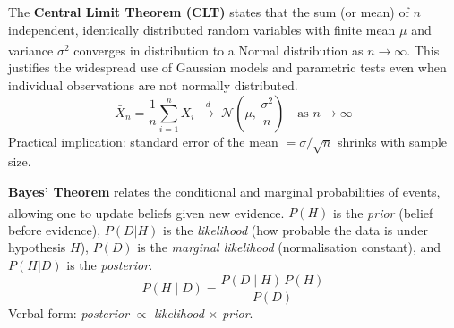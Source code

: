 \begin{tcbitemize}[ skin=sectionraster ]
        \tcbitem[title={Central Limit Theorem}, raster multicolumn=6]
        The \textbf{Central Limit Theorem (CLT)} states that the sum (or mean) of $n$ independent, identically distributed random variables with finite mean $\mu$ and variance $\sigma^2$ converges in distribution to a Normal distribution as $n \to \infty$\textsuperscript{\cite{downeyThinkStatsExploratory2015}}. This justifies the widespread use of Gaussian models and parametric tests even when individual observations are not normally distributed.
        \tcblower
        \begin{equation}
            \bar{X}_n = \frac{1}{n}\sum_{i=1}^n X_i \;\xrightarrow{d}\; \mathcal{N}\!\left(\mu,\, \frac{\sigma^2}{n}\right) \quad \text{as } n \to \infty
        \end{equation}
        Practical implication: standard error of the mean $= \sigma / \sqrt{n}$ shrinks with sample size.

        \tcbitem[title={Bayes’ Theorem}, raster multicolumn=6]
        \textbf{Bayes’ Theorem} relates the conditional and marginal probabilities of events, allowing one to update beliefs given new evidence\textsuperscript{\cite{downeyThinkBayes2016}}. $P(H)$ is the \emph{prior} (belief before evidence), $P(D|H)$ is the \emph{likelihood} (how probable the data is under hypothesis $H$), $P(D)$ is the \emph{marginal likelihood} (normalisation constant), and $P(H|D)$ is the \emph{posterior}.
        \tcblower
        \begin{equation}
            P(H \mid D) = \frac{P(D \mid H)\, P(H)}{P(D)}
        \end{equation}
        Verbal form: \emph{posterior} $\propto$ \emph{likelihood} $\times$ \emph{prior}.

    \end{tcbitemize}

